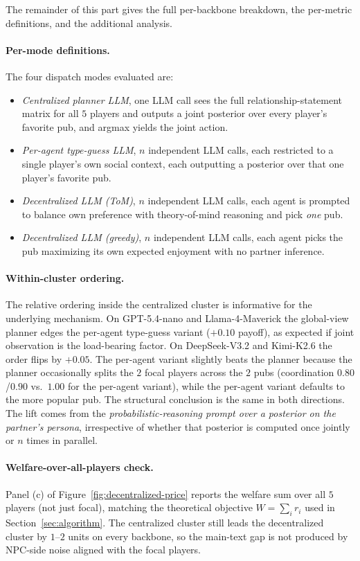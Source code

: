 The remainder of this part gives the full per-backbone breakdown, the per-metric definitions, and the additional analysis.

\paragraph{Per-mode definitions.} The four dispatch modes evaluated are:
\begin{itemize}\itemsep -1pt \topsep -2pt
  \item \emph{Centralized planner LLM}, one LLM call sees the full relationship-statement matrix for all $5$ players and outputs a joint posterior over every player's favorite pub, and argmax yields the joint action.
  \item \emph{Per-agent type-guess LLM}, $n$ independent LLM calls, each restricted to a single player's own social context, each outputting a posterior over that one player's favorite pub.
  \item \emph{Decentralized LLM (ToM)}, $n$ independent LLM calls, each agent is prompted to balance own preference with theory-of-mind reasoning and pick \emph{one} pub.
  \item \emph{Decentralized LLM (greedy)}, $n$ independent LLM calls, each agent picks the pub maximizing its own expected enjoyment with no partner inference.
\end{itemize}

\paragraph{Within-cluster ordering.} The relative ordering inside the centralized cluster is informative for the underlying mechanism. On GPT-5.4-nano and Llama-4-Maverick the global-view planner edges the per-agent type-guess variant ($+0.10$ payoff), as expected if joint observation is the load-bearing factor. On DeepSeek-V3.2 and Kimi-K2.6 the order flips by $+0.05$. The per-agent variant slightly beats the planner because the planner occasionally splits the $2$ focal players across the $2$ pubs (coordination $0.80$/$0.90$ vs.\ $1.00$ for the per-agent variant), while the per-agent variant defaults to the more popular pub. The structural conclusion is the same in both directions. The lift comes from the \emph{probabilistic-reasoning prompt over a posterior on the partner's persona}, irrespective of whether that posterior is computed once jointly or $n$ times in parallel.

\paragraph{Welfare-over-all-players check.} Panel (c) of Figure~\ref{fig:decentralized-price} reports the welfare sum over all $5$ players (not just focal), matching the theoretical objective $W = \sum_i r_i$ used in Section~\ref{sec:algorithm}. The centralized cluster still leads the decentralized cluster by $1$--$2$ units on every backbone, so the main-text gap is not produced by NPC-side noise aligned with the focal players.

